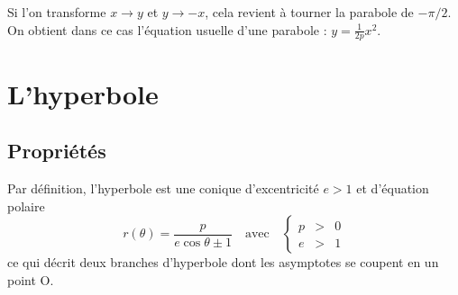 \begin{kaoremark}
Si l'on transforme $x\to y$ et $y\to -x$, cela revient à tourner la parabole de $-\pi/2$. On obtient dans ce cas l'équation usuelle d'une parabole : $y=\frac{1}{2p}x^2$.
\end{kaoremark} 

\section{L'hyperbole}
\subsection{Propriétés}
Par définition, l'hyperbole est une conique d'excentricité $e>1$ et d'équation polaire 
\[
r(\theta)=\frac{p}{e\cos\theta \pm1}
\quad\text{avec}\quad
\left\{\begin{array}{ccc}
p	&>& 0   \\
e	&>& 1  
\end{array}\right.
\]
ce qui décrit deux branches d'hyperbole dont les asymptotes se coupent en un point O. 

